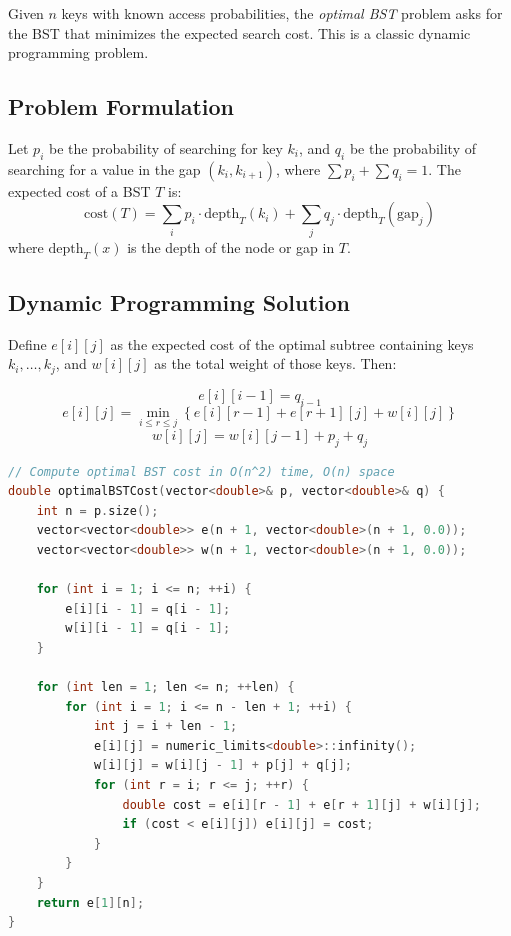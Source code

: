 Given $n$ keys with known access probabilities, the \emph{optimal BST} problem asks for the BST that minimizes the expected search cost. This is a classic dynamic programming problem.

\subsection{Problem Formulation}
\label{sec:optimal-bst-formulation}

Let $p_i$ be the probability of searching for key $k_i$, and $q_i$ be the probability of searching for a value in the gap $(k_i, k_{i+1})$, where $\sum p_i + \sum q_i = 1$. The expected cost of a BST $T$ is:
\[
  \text{cost}(T) = \sum_{i} p_i \cdot \text{depth}_T(k_i) + \sum_{j} q_j \cdot \text{depth}_T(\text{gap}_j)
\]
where $\text{depth}_T(x)$ is the depth of the node or gap in $T$.

\subsection{Dynamic Programming Solution}
\label{sec:optimal-bst-dp}

Define $e[i][j]$ as the expected cost of the optimal subtree containing keys $k_i, \ldots, k_j$, and $w[i][j]$ as the total weight of those keys. Then:

\[
  e[i][i-1] = q_{i-1}
\]
\[
  e[i][j] = \min_{i \leq r \leq j} \left\{ e[i][r-1] + e[r+1][j] + w[i][j] \right\}
\]
\[
  w[i][j] = w[i][j-1] + p_j + q_j
\]

\begin{lstlisting}[language=C++]
// Compute optimal BST cost in O(n^2) time, O(n) space
double optimalBSTCost(vector<double>& p, vector<double>& q) {
    int n = p.size();
    vector<vector<double>> e(n + 1, vector<double>(n + 1, 0.0));
    vector<vector<double>> w(n + 1, vector<double>(n + 1, 0.0));

    for (int i = 1; i <= n; ++i) {
        e[i][i - 1] = q[i - 1];
        w[i][i - 1] = q[i - 1];
    }

    for (int len = 1; len <= n; ++len) {
        for (int i = 1; i <= n - len + 1; ++i) {
            int j = i + len - 1;
            e[i][j] = numeric_limits<double>::infinity();
            w[i][j] = w[i][j - 1] + p[j] + q[j];
            for (int r = i; r <= j; ++r) {
                double cost = e[i][r - 1] + e[r + 1][j] + w[i][j];
                if (cost < e[i][j]) e[i][j] = cost;
            }
        }
    }
    return e[1][n];
}
\end{lstlisting}

